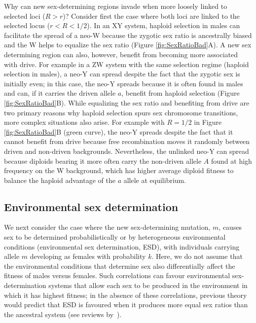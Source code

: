 \documentclass[10pt,letterpaper]{article}
\begin{document}
Why can new sex-determining regions invade when more loosely linked to selected loci ($R>r$)?  
Consider first the case where both loci are linked to the selected locus ($r<R<1/2$). 
In an XY system, haploid selection in males can facilitate the spread of a neo-W because the zygotic sex ratio is ancestrally biased and the W helps to equalize the sex ratio (Figure \ref{fig:SexRatioBad}A).  
A new sex determining region can also, however, benefit from becoming more associated with drive.  
For example in a ZW system with the same selection regime (haploid selection in males), a neo-Y can spread despite the fact that the zygotic sex is initially even; in this case, the neo-Y spreads because it is often found in males and can, if it carries the driven allele $a$, benefit from haploid selection (Figure \ref{fig:SexRatioBad}B).
While equalizing the sex ratio and benefiting from drive are two primary reasons why haploid selection spurs sex chromosome transitions, more complex situations also arise.  
For example with $R=1/2$ in Figure \ref{fig:SexRatioBad}B (green curve), the neo-Y spreads despite the fact that it cannot benefit from drive because free recombination moves it randomly between driven and non-driven backgrounds.  
Nevertheless, the unlinked neo-Y can spread because diploids bearing it more often carry the non-driven allele $A$ found at high frequency on the W background, which has higher average diploid fitness to balance the haploid advantage of the $a$ allele at equilibrium.

\subsection*{Environmental sex determination}

We next consider the case where the new sex-determining mutation, $m$, causes sex to be determined probabilistically or by heterogeneous environmental conditions (environmental sex determination, ESD), with individuals carrying allele $m$ developing as females with probability $k$.
Here, we do not assume that the environmental conditions that determine sex also differentially affect the fitness of males versus females. 
Such correlations can favour environmental sex-determination systems that allow each sex to be produced in the environment in which it has highest fitness; in the absence of these correlations, previous theory would predict that ESD is favoured when it produces more equal sex ratios than the ancestral system (see reviews by~\cite{Charnov:1982wg,Bull:1983vi,West:2009we}). %
\end{document}
